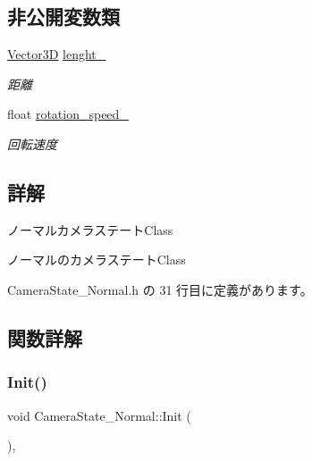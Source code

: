 \subsection*{非公開変数類}
\begin{DoxyCompactItemize}
\item 
\mbox{\hyperlink{class_vector3_d}{Vector3D}} \mbox{\hyperlink{class_camera_state___normal_aa7b4ddcfeca36912e3236c7532e2e8eb}{lenght\+\_\+}}
\begin{DoxyCompactList}\small\item\em 距離 \end{DoxyCompactList}\item 
float \mbox{\hyperlink{class_camera_state___normal_ab55771b7c607d086c919fc761aca5399}{rotation\+\_\+speed\+\_\+}}
\begin{DoxyCompactList}\small\item\em 回転速度 \end{DoxyCompactList}\end{DoxyCompactItemize}


\subsection{詳解}
ノーマルカメラステート\+Class 

ノーマルのカメラステート\+Class 

 Camera\+State\+\_\+\+Normal.\+h の 31 行目に定義があります。



\subsection{関数詳解}
\mbox{\label{class_camera_state___normal_a9e08312abffe36e42e53decdd015f079}} 
\subsubsection{\texorpdfstring{Init()}{Init()}}
{\footnotesize\ttfamily void Camera\+State\+\_\+\+Normal\+::\+Init (\begin{DoxyParamCaption}{ }\end{DoxyParamCaption})\hspace{0.3cm}{\ttfamily [override]}, {\ttfamily [virtual]}}



